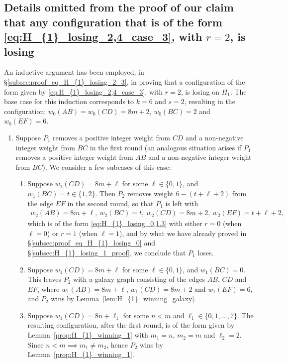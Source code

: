 \documentclass[11pt,reqno]{amsart}
\theoremstyle{definition}
\theoremstyle{definition}
\begin{document}
\subsection{Details omitted from the proof of our claim that any configuration that is of the form \eqref{eq:H_{1}_losing_2,4_case_3}, with $r=2$, is losing}\label{subsec:H_{1}_losing_2_3_base_case}
An inductive argument has been employed, in \S\ref{subsec:proof_eq_H_{1}_losing_2_3}, in proving that a configuration of the form given by \eqref{eq:H_{1}_losing_2,4_case_3}, with $r=2$, is losing on $H_{1}$. The base case for this induction corresponds to $k=6$ and $s=2$, resulting in the configuration: $w_{0}(AB)=w_{0}(CD)=8m+2$, $w_{0}(BC)=2$ and $w_{0}(EF)=6$.
\begin{enumerate}
\item Suppose $P_{1}$ removes a positive integer weight from $CD$ and a non-negative integer weight from $BC$ in the first round (an analogous situation arises if $P_{1}$ removes a positive integer weight from $AB$ and a non-negative integer weight from $BC$). We consider a few subcases of this case:
\begin{enumerate}
\item Suppose $w_{1}(CD)=8m+\ell$ for some $\ell \in \{0,1\}$, and $w_{1}(BC)=t\in \{1,2\}$. Then $P_{2}$ removes weight $6-(t+\ell+2)$ from the edge $EF$ in the second round, so that $P_{1}$ is left with
\begin{align}
w_{2}(AB)=8m+\ell,\ w_{2}(BC)=t,\ w_{2}(CD)=8m+2,\ w_{2}(EF)=t+\ell+2,\nonumber
\end{align}
which is of the form \eqref{eq:H_{1}_losing_0,1,3} with either $r=0$ (when $\ell=0$) or $r=1$ (when $\ell=1$), and by what we have already proved in \S\ref{subsec:proof_eq_H_{1}_losing_0} and \S\ref{subsec:H_{1}_losing_1_proof}, we conclude that $P_{1}$ loses.

\item Suppose $w_{1}(CD)=8m+\ell$ for some $\ell \in \{0,1\}$, and $w_{1}(BC)=0$. This leaves $P_{2}$ with a galaxy graph consisting of the edges $AB$, $CD$ and $EF$, where $w_{1}(AB)=8m+\ell$, $w_{1}(CD)=8m+2$ and $w_{1}(EF)=6$, and $P_{2}$ wins by Lemma~\ref{lem:H_{1}_winning_galaxy}. 

\item Suppose $w_{1}(CD)=8n+\ell_{1}$ for some $n < m$ and $\ell_{1} \in \{0,1,\ldots,7\}$. The resulting configuration, after the first round, is of the form given by Lemma~\ref{prop:H_{1}_winning_1} with $m_{1}=n$, $m_{2}=m$ and $\ell_{2}=2$. Since $n<m \implies m_{1}\neq m_{2}$, hence $P_{2}$ wins by Lemma~\ref{prop:H_{1}_winning_1}.
\end{enumerate}


\end{enumerate}
\end{document}
